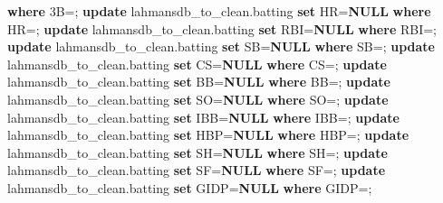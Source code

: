 \documentclass[11pt]{article}
\newenvironment{Shaded}{}{}
\newcommand{\KeywordTok}[1]{\textcolor[rgb]{0.00,0.44,0.13}{\textbf{{#1}}}}
\newcommand{\StringTok}[1]{\textcolor[rgb]{0.25,0.44,0.63}{{#1}}}
\newcommand{\NormalTok}[1]{{#1}}
\newcommand{\OperatorTok}[1]{\textcolor[rgb]{0.40,0.40,0.40}{{#1}}}
\begin{document}
\begin{Shaded}
\begin{Highlighting}[]
\KeywordTok{where}\NormalTok{ 3B}\OperatorTok{=}\StringTok{\textquotesingle{}\textquotesingle{}}\NormalTok{;}
\KeywordTok{update}\NormalTok{ lahmansdb\_to\_clean.batting}
\KeywordTok{set}\NormalTok{ HR}\OperatorTok{=}\KeywordTok{NULL}
\KeywordTok{where}\NormalTok{ HR}\OperatorTok{=}\StringTok{\textquotesingle{}\textquotesingle{}}\NormalTok{;}
\KeywordTok{update}\NormalTok{ lahmansdb\_to\_clean.batting}
\KeywordTok{set}\NormalTok{ RBI}\OperatorTok{=}\KeywordTok{NULL}
\KeywordTok{where}\NormalTok{ RBI}\OperatorTok{=}\StringTok{\textquotesingle{}\textquotesingle{}}\NormalTok{;}
\KeywordTok{update}\NormalTok{ lahmansdb\_to\_clean.batting}
\KeywordTok{set}\NormalTok{ SB}\OperatorTok{=}\KeywordTok{NULL}
\KeywordTok{where}\NormalTok{ SB}\OperatorTok{=}\StringTok{\textquotesingle{}\textquotesingle{}}\NormalTok{;}
\KeywordTok{update}\NormalTok{ lahmansdb\_to\_clean.batting}
\KeywordTok{set}\NormalTok{ CS}\OperatorTok{=}\KeywordTok{NULL}
\KeywordTok{where}\NormalTok{ CS}\OperatorTok{=}\StringTok{\textquotesingle{}\textquotesingle{}}\NormalTok{;}
\KeywordTok{update}\NormalTok{ lahmansdb\_to\_clean.batting}
\KeywordTok{set}\NormalTok{ BB}\OperatorTok{=}\KeywordTok{NULL}
\KeywordTok{where}\NormalTok{ BB}\OperatorTok{=}\StringTok{\textquotesingle{}\textquotesingle{}}\NormalTok{;}
\KeywordTok{update}\NormalTok{ lahmansdb\_to\_clean.batting}
\KeywordTok{set}\NormalTok{ SO}\OperatorTok{=}\KeywordTok{NULL}
\KeywordTok{where}\NormalTok{ SO}\OperatorTok{=}\StringTok{\textquotesingle{}\textquotesingle{}}\NormalTok{;}
\KeywordTok{update}\NormalTok{ lahmansdb\_to\_clean.batting}
\KeywordTok{set}\NormalTok{ IBB}\OperatorTok{=}\KeywordTok{NULL}
\KeywordTok{where}\NormalTok{ IBB}\OperatorTok{=}\StringTok{\textquotesingle{}\textquotesingle{}}\NormalTok{;}
\KeywordTok{update}\NormalTok{ lahmansdb\_to\_clean.batting}
\KeywordTok{set}\NormalTok{ HBP}\OperatorTok{=}\KeywordTok{NULL}
\KeywordTok{where}\NormalTok{ HBP}\OperatorTok{=}\StringTok{\textquotesingle{}\textquotesingle{}}\NormalTok{;}
\KeywordTok{update}\NormalTok{ lahmansdb\_to\_clean.batting}
\KeywordTok{set}\NormalTok{ SH}\OperatorTok{=}\KeywordTok{NULL}
\KeywordTok{where}\NormalTok{ SH}\OperatorTok{=}\StringTok{\textquotesingle{}\textquotesingle{}}\NormalTok{;}
\KeywordTok{update}\NormalTok{ lahmansdb\_to\_clean.batting}
\KeywordTok{set}\NormalTok{ SF}\OperatorTok{=}\KeywordTok{NULL}
\KeywordTok{where}\NormalTok{ SF}\OperatorTok{=}\StringTok{\textquotesingle{}\textquotesingle{}}\NormalTok{;}
\KeywordTok{update}\NormalTok{ lahmansdb\_to\_clean.batting}
\KeywordTok{set}\NormalTok{ GIDP}\OperatorTok{=}\KeywordTok{NULL}
\KeywordTok{where}\NormalTok{ GIDP}\OperatorTok{=}\StringTok{\textquotesingle{}\textquotesingle{}}\NormalTok{;}
\end{Highlighting}
\end{Shaded}
\end{document}
